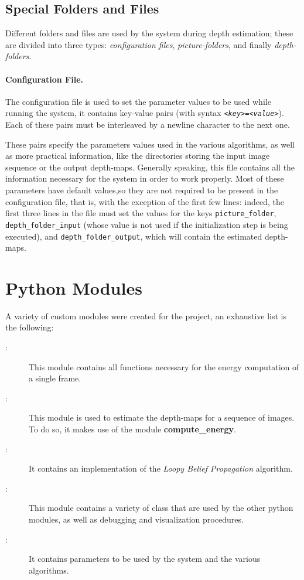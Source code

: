 \documentclass[notitlepage,english]{hgbreport}
\begin{document}
\subsection{Special Folders and Files}
Different folders and files are used by the system during depth estimation; these are divided into three types: \emph{configuration files}, \emph{picture-folders}, and finally \emph{depth-folders}.

\paragraph{Configuration File.} The configuration file is used to set the parameter values to be used while running the system, it contains key-value pairs (with syntax \texttt{<\emph{key}>=<\emph{value}>}).
Each of these pairs must be interleaved by a newline character to the next one.

These pairs specify the parameters values used in the various algorithms, as well as more practical information, like the directories storing the input image sequence or the output depth-maps. Generally speaking, this file contains all the information necessary for the system in order to work properly. Most of these parameters have default values,so they are not required to be present in the configuration file, that is, with the exception of the first few lines: indeed, the first three lines in the file must set the values for the keys \texttt{picture\_folder}, \texttt{depth\_folder\_input} (whose value is not used if the initialization step is being executed), and \texttt{depth\_folder\_output}, which will contain the estimated depth-maps.



\section{Python Modules}
A variety of custom modules were created for the project, an exhaustive list is the following:
\begin{description}
	\item[\ComputeEnergy:] This module contains all functions necessary for the energy computation of a single frame.
	\item[\Estimate:] This module is used to estimate the depth-maps for a sequence of images. To do so, it makes use of the module \textbf{compute\_energy}.
	\item[\Lbp:] It contains an implementation of the \emph{Loopy Belief Propagation} algorithm.
	\item[\Utils:] This module contains a variety of class that are used by the other python modules, as well as debugging and visualization procedures.
	\item[\Params:] It contains parameters to be used by the system and the various algorithms.
\end{description}
\end{document}
